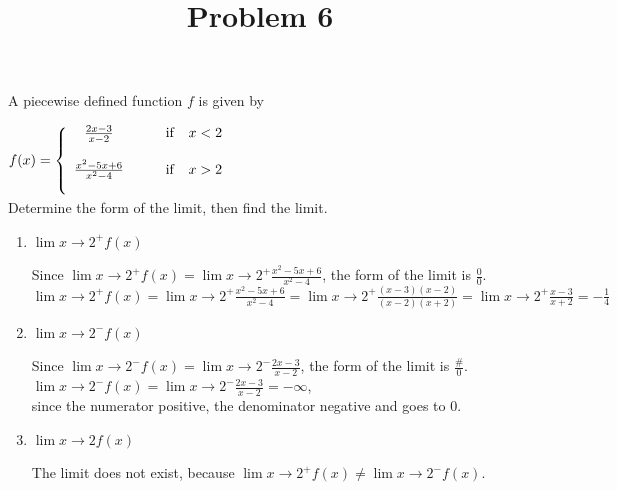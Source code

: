 \documentclass{ximera}
\title[Problem 6]{Problem 6}
\begin{document}
\begin{abstract} \end{abstract}
\maketitle


\begin{problem}
A  piecewise defined function $f$ is given by 
 
	$f(x) =   \left\{ \begin{array}{cl}
	\frac{2 x-3}{x-2}		 	&	\qquad \text{if }\hspace{0.1in}  x <  2					\\ \\
	\frac{x^2-5x +6}{x^2-4}	&	\qquad \text{if } \hspace{0.1in}   x>2 	\\ \\
		
						\end{array} \right.  $\\[1em]
	Determine the form of the limit, then find the limit.
  \begin{enumerate}

    \item $ \displaystyle \lim{x \to 2^+} f(x)$
\begin{explanation}
   
   Since $ \displaystyle \lim{x \to 2^+} f(x)= \displaystyle \lim{x \to 2^+}\frac{x^2-5x +6}{x^2-4}$, the form of the limit is $\frac{0}{0}$.\\[1em]
     $ \displaystyle \lim{x \to 2^+} f(x)= \displaystyle \lim{x \to 2^+}\frac{x^2-5x +6}{x^2-4}= \displaystyle \lim{x \to 2^+}\frac{(x-3)(x-2)}{(x-2)(x+2)}= \displaystyle \lim{x \to 2^+}\frac{x-3}{x+2}=-\frac{1}{4}$
    \end{explanation}
  \item   $ \displaystyle \lim{x \to 2^-} f(x)$
\begin{explanation}
   
   Since $ \displaystyle \lim{x \to 2^-} f(x)= \displaystyle \lim{x \to 2^-}\frac{2x-3}{x-2}$, the form of the limit is $\frac{\#}{0}$.\\[1em]
     $ \displaystyle \lim{x \to 2^-} f(x)=  \displaystyle \lim{x \to 2^-}\frac{2x-3}{x-2}= -\infty$,\\[1em]
      since the numerator  positive, the denominator negative and goes to 0.
    \end{explanation}
 \item $ \displaystyle \lim{x \to 2} f(x)$
\begin{explanation}
   The limit does not exist, because  $ \displaystyle \lim{x \to 2^+} f(x)\ne \displaystyle \lim{x \to 2^-} f(x)$.
    \end{explanation}
      \end{enumerate}
\end{problem}
\end{document}
